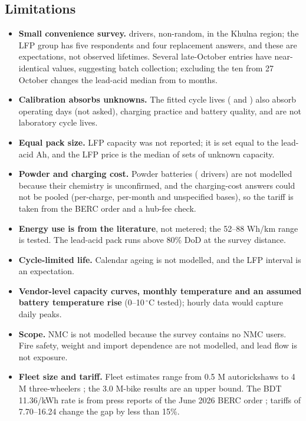 \subsection{Limitations}
\label{sec:limits}
\begin{itemize}
\item \textbf{Small convenience survey.} \nSurvey{} drivers, non-random, in the Khulna region; the LFP group has five respondents and four replacement answers, and these are expectations, not observed lifetimes. Several late-October entries have near-identical values, suggesting batch collection; excluding the ten from 27 October changes the lead-acid median from \replMedLA{} to \replLAnobatch{} months. 
\item \textbf{Calibration absorbs unknowns.} The fitted cycle lives (\NcalLA{} and \NcalLFP{}) also absorb operating days (not asked), charging practice and battery quality, and are not laboratory cycle lives.
\item \textbf{Equal pack size.} LFP capacity was not reported; it is set equal to the lead-acid Ah, and the LFP price is the median of sets of unknown capacity.
\item \textbf{Powder and charging cost.} Powder batteries (\nPW{} drivers) are not modelled because their chemistry is unconfirmed, and the charging-cost answers could not be pooled (per-charge, per-month and unspecified bases), so the tariff is taken from the BERC order and a hub-fee check.
\item \textbf{Energy use is from the literature}, not metered; the 52--88 Wh/km range is tested. The lead-acid pack runs above 80\% DoD at the survey distance.
\item \textbf{Cycle-limited life.} Calendar ageing is not modelled, and the LFP interval is an expectation.
\item \textbf{Vendor-level capacity curves, monthly temperature and an assumed battery temperature rise} (0--10\,$^\circ$C tested); hourly data would capture daily peaks.
\item \textbf{Scope.} NMC is not modelled because the survey contains no NMC users. Fire safety, weight and import dependence are not modelled, and lead flow is not exposure.
\item \textbf{Fleet size and tariff.} Fleet estimates range from 0.5 M autorickshaws to 4 M three-wheelers \cite{clean2024,pureearth_smep,unctad_smep}; the 3.0 M-bike results are an upper bound. The BDT 11.36/kWh rate is from press reports of the June 2026 BERC order \cite{berc2026fe,fenews2026}; tariffs of 7.70--16.24 change the gap by less than 15\%.
\end{itemize}
